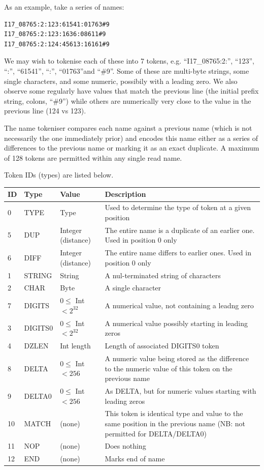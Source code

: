 \documentclass[a4paper]{article}
\begin{document}
As an example, take a series of names:

\begin{verbatim}
I17_08765:2:123:61541:01763#9
I17_08765:2:123:1636:08611#9
I17_08765:2:124:45613:16161#9
\end{verbatim}

We may wish to tokenise each of these into 7 tokens, e.g.
``I17\_08765:2:'', ``123'', ``:'', ``61541'', ``:'', ``01763''and
``\#9''. Some of these are multi-byte strings, some single characters,
and some numeric, possibily with a leading zero.  We also observe some
regularly have values that match the previous line (the initial prefix
string, colons, ``\#9'') while others are numerically very close to the
value in the previous line (124 vs 123).

The name tokeniser compares each name against a previous name (which
is not necessarily the one immediately prior) and encodes this name
either as a series of differences to the previous name or marking it
as an exact duplicate.  A maximum of 128 tokens are permitted within
any single read name.

Token IDs (types) are listed below.

\begin{tabular}{lllp{10cm}}
\hline
\textbf{ID} & \textbf{Type} & \textbf{Value} & \textbf{Description}\\
\hline
 0 & TYPE    & Type    & Used to determine the type of token at a given position \\
\hline
 5 & DUP     & Integer (distance) & The entire name is a duplicate of an earlier one.  Used in position 0 only\\
 6 & DIFF    & Integer (distance) & The entire name differs to earlier ones.  Used in position 0 only\\
\hline
 1 & STRING  & String  & A nul-terminated string of characters \\
 2 & CHAR    & Byte    & A single character \\
 7 & DIGITS  & $0 \le$ Int $< 2^{32}$ & A numerical value, not containing a leadng zero \\
 3 & DIGITS0 & $0 \le$ Int $< 2^{32}$ & A numerical value possibly starting in leading zeros \\
 4 & DZLEN   & Int length & Length of associated DIGITS0 token\\
 8 & DELTA  & $0 \le$ Int $< 256$   & A numeric value being stored as the difference to the numeric value of this token on the previous name \\
 9 & DELTA0 & $0 \le$ Int $< 256$ & As DELTA, but for numeric values starting with leading zeros \\
10 & MATCH   & (none) & This token is identical type and value to the same position in the previous name (NB: not permitted for DELTA/DELTA0)\\
11 & NOP & (none) & Does nothing\\
12 & END     & (none) & Marks end of name\\
\hline
\end{tabular}
\end{document}
